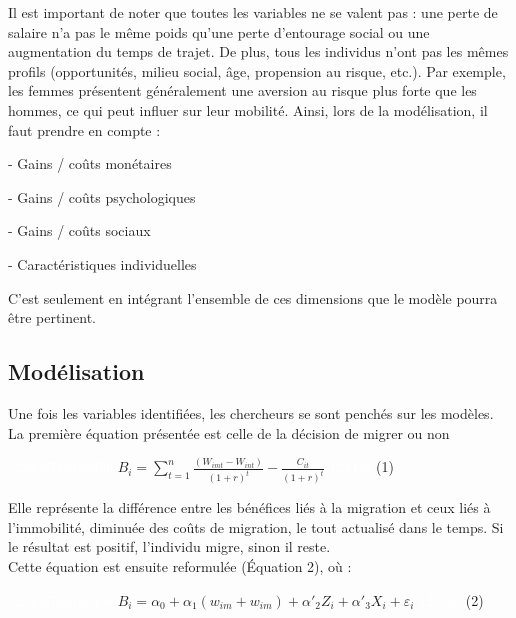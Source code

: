 \documentclass{article}
\begin{document}
Il est important de noter que toutes les variables ne se valent pas : une perte de salaire n’a pas le même poids qu’une perte d’entourage social ou une augmentation du temps de trajet. De plus, tous les individus n’ont pas les mêmes profils (opportunités, milieu social, âge, propension au risque, etc.). Par exemple, les femmes présentent généralement une aversion au risque plus forte que les hommes, ce qui peut influer sur leur mobilité.
Ainsi, lors de la modélisation, il faut prendre en compte :

\vspace{5pt}

 - Gains / coûts monétaires

 - Gains / coûts psychologiques

 - Gains / coûts sociaux

- Caractéristiques individuelles

\vspace{5pt}

C’est seulement en intégrant l’ensemble de ces dimensions que le modèle pourra être pertinent.

\newpage

\subsection{Modélisation}

Une fois les variables identifiées, les chercheurs se sont penchés sur les modèles.
La première équation présentée est celle de la décision de migrer ou non 

\vspace{5pt}

\textcolor{white}{123456789123456}  $B_i = \sum_{t=1}^{n} \frac{(W_{imt} - W_{int})}{(1 + r)^t} - \frac{C_{it}}{(1 + r)^t}$   \textcolor{white}{123456}   (1)

\vspace{5pt}

Elle représente la différence entre les bénéfices liés à la migration et ceux liés à l’immobilité, diminuée des coûts de migration, le tout actualisé dans le temps. Si le résultat est positif, l’individu migre, sinon il reste.\\
Cette équation est ensuite reformulée (Équation 2), où :

\vspace{5pt}

\textcolor{white}{123456789123456} $B_i = \alpha_0 + \alpha_1(w_{im} + w_{im}) + \alpha'_2Z_i + \alpha'_3X_i + \varepsilon_i $ \textcolor{white}{123456}   (2)
\end{document}
